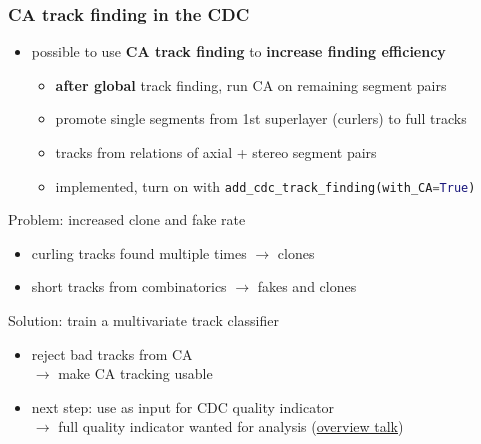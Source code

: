 \documentclass[18pt, aspectratio=169]{beamer}
\newcommand{\greenbold}[1]{\textcolor{kit-green100}{\bf{#1}}}
\newcommand{\orangebold}[1]{\textcolor{kit-orange100}{\bf{#1}}}
\begin{document}
\begin{frame}
  \frametitle{CA track finding in the CDC}
  \begin{itemize}
  \item possible to use \greenbold{CA track finding} to \orangebold{increase finding efficiency}
    \begin{itemize}
    \item \greenbold{after global} track finding, run CA on remaining segment pairs
    \item promote single segments from 1st superlayer (curlers) to full tracks
    \item tracks from relations of axial + stereo segment pairs
    \item implemented, turn on with \lstinline[language=python]{add_cdc_track_finding(with_CA=True)}            
    \end{itemize}
    
  \end{itemize}
  \pause
  \begin{alertblock}{Problem: increased clone and fake rate}
    \begin{itemize}
    \item curling tracks found multiple times $\rightarrow$ clones
    \item short tracks from combinatorics $\rightarrow$ fakes and clones
    \end{itemize}
  \end{alertblock}

  \begin{block}{Solution: train a multivariate track classifier}
    \begin{itemize}
    \item reject bad tracks from CA\\
      $\rightarrow$ make CA tracking usable
    \item next step: use as input for  CDC quality indicator\\
    $\rightarrow$ full quality indicator wanted for analysis
    (\href{https://kds.kek.jp/indico/event/26522/session/10/contribution/75/material/slides/0.pdf}{overview
      talk})
  \end{itemize}
\end{block}
\end{frame}
\end{document}
